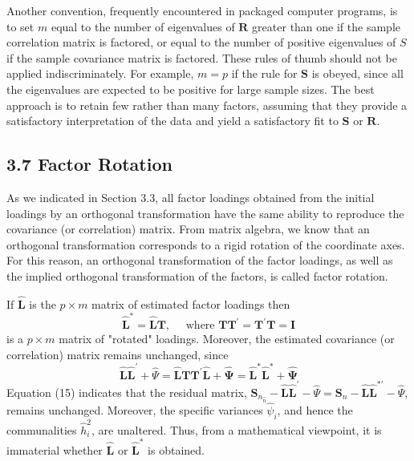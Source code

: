 \documentclass[12pt]{article}
\numberwithin{equation}{section}
\begin{document}
\noindent Another convention, frequently encountered in packaged computer programs, is to set $m$ equal to the number of eigenvalues of $\mathbf{R}$ greater than one if the sample correlation matrix is factored, or equal to the number of positive eigenvalues of $S$ if the sample covariance matrix is factored. These rules of thumb should not be applied indiscriminately. For example, $m=p$ if the rule for $\mathbf{S}$ is obeyed, since all the eigenvalues are expected to be positive for large sample sizes. The best approach is to retain few rather than many factors, assuming that they provide a satisfactory interpretation of the data and yield a satisfactory fit to $\mathbf{S}$ or $\mathbf{R}$.

\subsection*{3.7 Factor Rotation}

As we indicated in Section 3.3, all factor loadings obtained from the initial loadings by an orthogonal transformation have the same ability to reproduce the covariance (or correlation) matrix. From matrix algebra, we know that an orthogonal transformation corresponds to a rigid rotation of the coordinate axes. For this reason, an orthogonal transformation of the factor loadings, as well as the implied orthogonal transformation of the factors, is called factor rotation.

\noindent If $\hat{\mathbf{L}}$ is the $p \times m$ matrix of estimated factor loadings then
\begin{equation}
	\hat{\mathbf{L}}^*=\hat{\mathbf{L}} \mathbf{T}, \quad \text { where } \mathbf{T T}^{\prime}=\mathbf{T}^{\prime} \mathbf{T}=\mathbf{I}
\end{equation}
is a $p \times m$ matrix of "rotated" loadings. Moreover, the estimated covariance (or correlation) matrix remains unchanged, since
\begin{equation}
	\hat{\mathbf{L}} \hat{\mathbf{L}}^{\prime}+\hat{\Psi}=\hat{\mathbf{L}} \mathbf{T T}^{\prime} \hat{\mathbf{L}}+\hat{\boldsymbol{\Psi}}=\hat{\mathbf{L}}^* \hat{\mathbf{L}}^*+\hat{\boldsymbol{\Psi}}
\end{equation}
Equation (15) indicates that the residual matrix, $\mathbf{S}_{n_{\hat{n}}}-\hat{\mathbf{L}} \hat{\mathbf{L}}^{\prime}-\hat{\Psi}=\mathbf{S}_n-\hat{\mathbf{L}} \hat{\mathbf{L}}^{* \prime}-\hat{\Psi}$, remains unchanged. Moreover, the specific variances $\hat{\psi}_i$, and hence the communalities $\hat{h}_i^2$, are unaltered. Thus, from a mathematical viewpoint, it is immaterial whether $\hat{\mathbf{L}}$ or $\hat{\mathbf{L}}^*$ is obtained.
\end{document}
